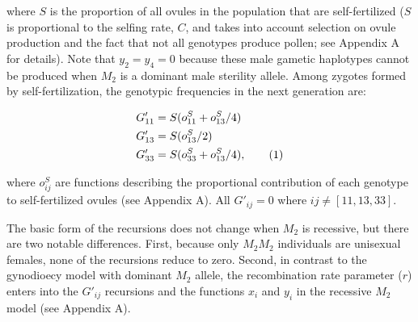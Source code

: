 \documentclass{article}
\newcommand\hl[1]{%
  \bgroup
  \hskip0pt\color{blue!80!black}%
  #1%
  \egroup
}
\newcommand\numberthis{\addtocounter{equation}{1}\tag{\theequation}}
\begin{document}

\noindent where $S$ is the proportion of all ovules in the population that are self-fertilized ($S$ is proportional to the selfing rate, $C$, and \hl{takes into account} selection on ovule production and the fact that not all genotypes produce pollen; see Appendix A for details). Note that $y_2=y_4=0$ because these male gametic haplotypes cannot be produced when $M_2$ is a dominant male sterility allele. Among zygotes formed by self-fertilization, the genotypic frequencies in the next generation are: 
\begin{linenomath}\begin{align*} \label{eq:GprGyn}
    G'_{11} &= S (o^S_{11} + o^S_{13}/4) \\
    G'_{13} &= S (o^S_{13}/2) \\
    G'_{33} &= S (o^S_{33} + o^S_{13}/4), \numberthis
\end{align*} \end{linenomath}

\noindent where $o^S_{ij}$ are functions describing the proportional contribution of each genotype to self-fertilized ovules (see Appendix A). All $G'_{ij} = 0$ where $ij \neq [11,13,33]$. 

The basic form of the recursions does not change when $M_2$ is recessive, but there are two notable differences. First, because only $M_2M_2$ individuals are unisexual females, none of the recursions reduce to zero. Second, in contrast to the gynodioecy model with dominant $M_2$ allele, the recombination rate parameter ($r$) enters into the $G'_{ij}$ recursions and the functions $x_i$ and $y_i$ in the recessive $M_2$ model (see Appendix A).
\end{document}
